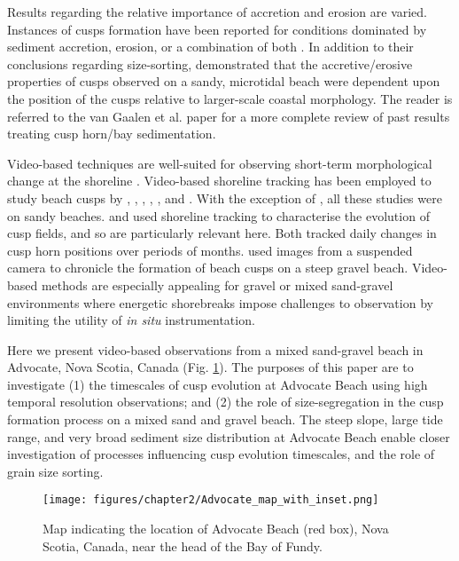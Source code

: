 Results regarding the relative importance of accretion and erosion are varied. Instances of cusps formation have been reported for conditions dominated by sediment accretion, erosion, or a combination of both \citep[e.g., ][]{Antia1987, Masselink1997, Almar_etal2008}. In addition to their conclusions regarding size-sorting, \citet{VanGaalen_etal2011} demonstrated that the accretive/erosive properties of cusps observed on a sandy, microtidal beach were dependent upon the position of the cusps relative to larger-scale coastal morphology. The reader is referred to the van Gaalen et al. paper for a more complete review of past results treating cusp horn/bay sedimentation.
 
Video-based techniques are well-suited for observing short-term morphological change at the shoreline \citep[e.g.,][]{Holman_Stanley2007}. Video-based shoreline tracking has been employed to study beach cusps by \citet{Holland_Holman1996}, \citet{Holland1998}, \citet{Sunamura_Aoki2000}, \citet{Almar_etal2008}, \citet{Garnier_etal2010}, and \citet{Vousdoukas2012}. With the exception of \citet{Sunamura_Aoki2000}, all these studies were on sandy beaches. \citet{Almar_etal2008} and \citet{Vousdoukas2012} used shoreline tracking to characterise the evolution of cusp fields, and so are particularly relevant here. Both tracked daily changes in cusp horn positions over periods of months. \citet{Sunamura_Aoki2000} used images from a suspended camera to chronicle the formation of beach cusps on a steep gravel beach. Video-based methods are especially appealing for gravel or mixed sand-gravel environments where energetic shorebreaks impose challenges to observation by limiting the utility of \textit{in situ} instrumentation.

Here we present video-based observations from a mixed sand-gravel beach in Advocate, Nova Scotia, Canada (Fig. \ref{fig:Advocate_map}). The purposes of this paper are to investigate (1) the timescales of cusp evolution at Advocate Beach using high temporal resolution observations; and (2) the role of size-segregation in the cusp formation process on a mixed sand and gravel beach. The steep slope, large tide range, and very broad sediment size distribution at Advocate Beach enable closer investigation of processes influencing cusp evolution timescales, and the role of grain size sorting.

\begin{figure}[tbp] %
	\texttt{[image: figures/chapter2/Advocate\_map\_with\_inset.png]}
	\caption[Map: Advocate Beach site]{Map indicating the location of Advocate Beach (red box), Nova Scotia, Canada, near the head of the Bay of Fundy.}
	\label{fig:Advocate_map}
\end{figure} 

